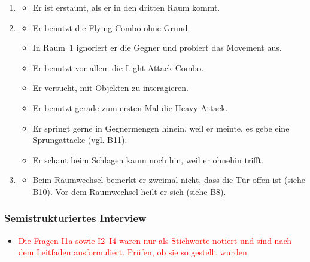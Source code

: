 \documentclass[../Main.tex]{subfiles}
\begin{document}
\begin{enumerate}[label=\textbf{B\arabic*}, leftmargin=1.5cm, itemsep=0.8em, resume]
\begin{itemize}[nosep]
    \item Er findet die Ästhetik schön.
    \item Er wünscht sich einen Block.
    \item Er findet das Movement richtig cool und meint, es habe eine Lernkurve.
    \item Er findet die Animationen des Heavy Soldiers und des Chain Archers cool.
\end{itemize}
\item
\begin{itemize}[nosep]
    \item Er ist erstaunt, als er in den dritten Raum kommt.
\end{itemize}
\item
\begin{itemize}[nosep]
    \item Er benutzt die Flying Combo ohne Grund.
    \item In Raum~1 ignoriert er die Gegner und probiert das Movement aus.
    \item Er benutzt vor allem die Light-Attack-Combo.
    \item Er versucht, mit Objekten zu interagieren.
    \item Er benutzt gerade zum ersten Mal die Heavy Attack.
    \item Er springt gerne in Gegnermengen hinein, weil er meinte, es gebe eine Sprungattacke (vgl. B11).
    \item Er schaut beim Schlagen kaum noch hin, weil er ohnehin trifft.
\end{itemize}
\item
\begin{itemize}[nosep]
    \item Beim Raumwechsel bemerkt er zweimal nicht, dass die Tür offen ist (siehe B10). Vor dem Raumwechsel heilt er sich (siehe B8).
\end{itemize}
\end{enumerate}

\subsubsection{Semistrukturiertes Interview}

\begin{itemize}[leftmargin=1.5cm]
    \item \textcolor{red}{Die Fragen I1a sowie I2--I4 waren nur als Stichworte notiert und sind nach dem Leitfaden ausformuliert. Prüfen, ob sie so gestellt wurden.}
\end{itemize}
\end{document}

